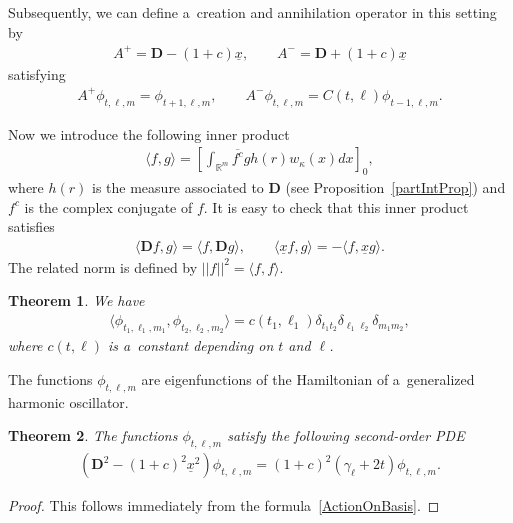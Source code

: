 \documentclass[11pt]{article}
\newtheorem{theorem}{Theorem}
\numberwithin{equation}{section}
\numberwithin{theorem}{section}
\numberwithin{proposition}{section}
\numberwithin{lemma}{section}
\numberwithin{corollary}{section}
\numberwithin{definition}{section}
\numberwithin{example}{section}
\numberwithin{remark}{section}
\numberwithin{note}{section}
\theoremstyle{remark}
\newcommand{\mR}{\mathbb{R}}
\newcommand{\dD}{\textbf{D}}
\newcommand{\ux}{\underline{x}}
\def\k{{\kappa}}
\def\la{{\langle}}
\def\ra{{\rangle}}
\begin{document}
Subsequently, we can def\/ine a~creation and annihilation operator in this setting by
\begin{gather}\label{CreaAnn}
A^{+} = \dD - (1+c) \ux,\qquad
A^{-} = \dD + (1+c) \ux
\end{gather}
satisfying
\begin{gather*}%
A^{+} \phi_{t,\ell,m} = \phi_{t+1,\ell,m},\qquad
A^{-} \phi_{t,\ell,m} = C(t, \ell) \phi_{t-1,\ell,m}.
\end{gather*}

Now we introduce the following inner product
\begin{gather*}
\langle f,g\rangle=\left[\int_{\mR^{m}}\overline{f^{c}}g h(r)w_{\k}(x)dx\right]_{0},
\end{gather*}
where $h(r)$ is the measure associated to $\dD$ (see Proposition~\ref{partIntProp}) and $f^{c}$ is
the complex conjugate of $f$.
It is easy to check that this inner product satisf\/ies
\begin{gather}\label{adjointsIP}
\langle \dD f, g \rangle = \la f, \dD g\ra,\qquad
\la \ux f, g \ra = -\la f, \ux g \ra.
\end{gather}
The related norm is def\/ined by $||f||^{2}=\la f,f\ra$.

\begin{theorem}%
We have
\begin{gather*}
\langle\phi_{t_{1},\ell_{1},m_{1}},\phi_{t_{2},\ell_{2},m_{2}}\rangle=c(t_{1},\ell_{1})
\delta_{t_{1}t_{2}}\delta_{\ell_{1}\ell_{2}}\delta_{m_{1}m_{2}},
\end{gather*}
where $c(t,\ell)$ is a~constant depending on $t$ and $\ell$.
\end{theorem}

The functions $\phi_{t,\ell,m}$ are eigenfunctions of the Hamiltonian of a~generalized harmonic
oscillator.
\begin{theorem}
\label{HarmOsc}
The functions $\phi_{t,\ell,m}$ satisfy the following second-order PDE
\begin{gather*}
\left(\dD^{2}-(1+c)^{2}\ux^{2}\right)\phi_{t,\ell,m}=(1+c)^{2}(\gamma_{\ell}+2t)
\phi_{t,\ell,m}.
\end{gather*}
\end{theorem}

\begin{proof}
This follows immediately from the formula~\eqref{ActionOnBasis}.
\end{proof}
\end{document}
